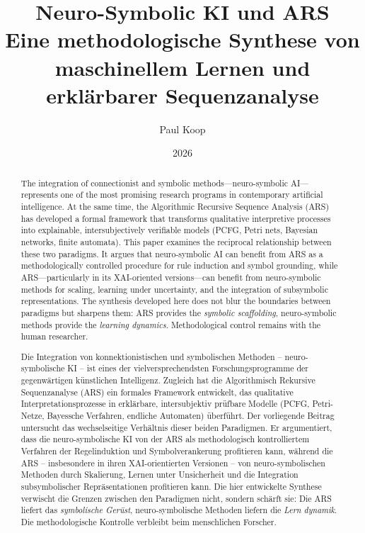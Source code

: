 \documentclass[12pt,a4paper]{article}
\title{\Huge\textbf{Neuro-Symbolic KI und ARS} \\
       \LARGE Eine methodologische Synthese von\\
       \LARGE maschinellem Lernen und erklärbarer Sequenzanalyse}
\author{
  \large
  \begin{tabular}{c}
    Paul Koop
  \end{tabular}
}
\date{\large 2026}
\begin{document}
\maketitle

\begin{abstract}
The integration of connectionist and symbolic methods—neuro-symbolic AI—represents 
one of the most promising research programs in contemporary artificial intelligence. 
At the same time, the Algorithmic Recursive Sequence Analysis (ARS) has developed 
a formal framework that transforms qualitative interpretive processes into 
explainable, intersubjectively verifiable models (PCFG, Petri nets, Bayesian 
networks, finite automata). This paper examines the reciprocal relationship 
between these two paradigms. It argues that neuro-symbolic AI can benefit from 
ARS as a methodologically controlled procedure for rule induction and symbol 
grounding, while ARS—particularly in its XAI-oriented versions—can benefit from 
neuro-symbolic methods for scaling, learning under uncertainty, and the integration 
of subsymbolic representations. The synthesis developed here does not blur the 
boundaries between paradigms but sharpens them: ARS provides the \textit{symbolic 
scaffolding}, neuro-symbolic methods provide the \textit{learning dynamics}. 
Methodological control remains with the human researcher.

Die Integration von konnektionistischen und symbolischen Methoden – neuro-symbolische 
KI – ist eines der vielversprechendsten Forschungsprogramme der gegenwärtigen 
künstlichen Intelligenz. Zugleich hat die Algorithmisch Rekursive Sequenzanalyse 
(ARS) ein formales Framework entwickelt, das qualitative Interpretationsprozesse 
in erklärbare, intersubjektiv prüfbare Modelle (PCFG, Petri-Netze, Bayessche 
Verfahren, endliche Automaten) überführt. Der vorliegende Beitrag untersucht das 
wechselseitige Verhältnis dieser beiden Paradigmen. Er argumentiert, dass die 
neuro-symbolische KI von der ARS als methodologisch kontrolliertem Verfahren der 
Regelinduktion und Symbolverankerung profitieren kann, während die ARS – insbesondere 
in ihren XAI-orientierten Versionen – von neuro-symbolischen Methoden durch Skalierung, 
Lernen unter Unsicherheit und die Integration subsymbolischer Repräsentationen 
profitieren kann. Die hier entwickelte Synthese verwischt die Grenzen zwischen den 
Paradigmen nicht, sondern schärft sie: Die ARS liefert das \textit{symbolische 
Gerüst}, neuro-symbolische Methoden liefern die \textit{Lern dynamik}. Die 
methodologische Kontrolle verbleibt beim menschlichen Forscher.
\end{abstract}
\end{document}
